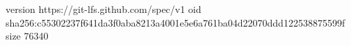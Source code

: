 version https://git-lfs.github.com/spec/v1
oid sha256:c55302237f641da3f0aba8213a4001e5e6a761ba04d22070ddd122538875599f
size 76340
